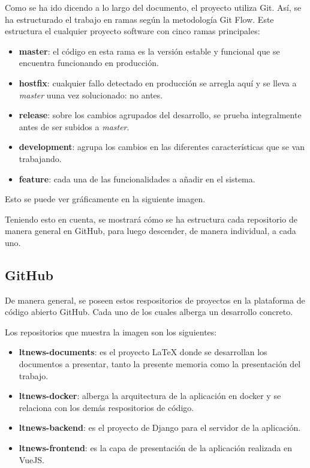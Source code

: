 Como se ha ido dicendo a lo largo del documento, el proyecto utiliza Git. Así, se ha estructurado el trabajo en ramas según la metodología Git Flow. Este estructura el cualquier proyecto software con cinco ramas principales:

\begin{itemize}
    \item \textbf{master}: el código en esta rama es la versión estable y funcional que se encuentra funcionando en producción.
    \item \textbf{hostfix}: cualquier fallo detectado en producción se arregla aquí y se lleva a \textit{master} uuna vez solucionado: no antes.
    \item \textbf{release}: sobre los cambios agrupados del desarrollo, se prueba integralmente antes de ser subidos a \textit{master}.
    \item \textbf{development}: agrupa los cambios en las diferentes características que se van trabajando.
    \item \textbf{feature}: cada una de las funcionalidades a añadir en el sistema.
\end{itemize}

Esto se puede ver gráficamente en la siguiente imagen.


Teniendo esto en cuenta, se mostrará cómo se ha estructura cada repositorio de manera general en GitHub, para luego descender, de manera individual, a cada uno.

\subsection{GitHub}

De manera general, se poseen estos respositorios de proyectos en la plataforma de código abierto GitHub. Cada uno de los cuales alberga un desarrollo concreto.


Los repositorios que muestra la imagen son los siguientes:

\begin{itemize}
    \item \textbf{ltnews-documents}: es el proyecto LaTeX donde se desarrollan los documentos a presentar, tanto la presente memoria como la presentación del trabajo.
    \item \textbf{ltnews-docker}: alberga la arquitectura de la aplicación en docker y se relaciona con los demás respositorios de código.
    \item \textbf{ltnews-backend}: es el proyecto de Django para el servidor de la aplicación.
    \item \textbf{ltnews-frontend}: es la capa de presentación de la aplicación
     realizada en VueJS.
\end{itemize}

